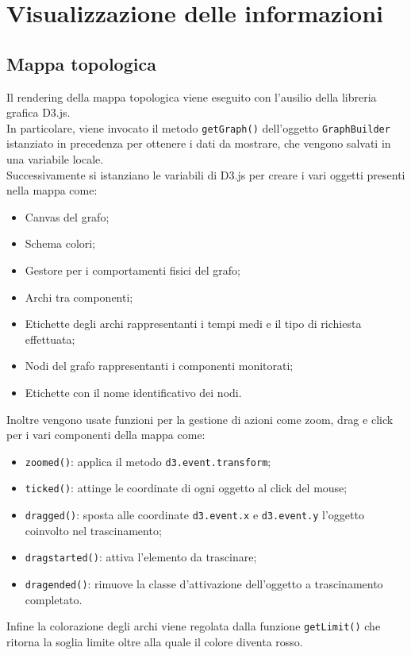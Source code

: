\section{Visualizzazione delle informazioni}

\subsection{Mappa topologica}
Il rendering della mappa topologica viene eseguito con l'ausilio della libreria grafica D3.js. \\
In particolare, viene invocato il metodo \texttt{getGraph()} dell'oggetto \texttt{GraphBuilder} istanziato in precedenza per ottenere i dati da mostrare, che vengono salvati in una variabile locale. \\
Successivamente si istanziano le variabili di D3.js per creare i vari oggetti presenti nella mappa come:
\begin{itemize}
	\item Canvas del grafo;
	\item Schema colori;
	\item Gestore per i comportamenti fisici del grafo;
	\item Archi tra componenti;
	\item Etichette degli archi rappresentanti i tempi medi e il tipo di richiesta effettuata;
	\item Nodi del grafo rappresentanti i componenti monitorati;
	\item Etichette con il nome identificativo dei nodi.
\end{itemize}
Inoltre vengono usate funzioni per la gestione di azioni come zoom, drag e click per i vari componenti della mappa come:
\begin{itemize}
	\item \texttt{zoomed()}: applica il metodo \texttt{d3.event.transform};
	\item \texttt{ticked()}: attinge le coordinate di ogni oggetto al click del mouse;
	\item \texttt{dragged()}: sposta alle coordinate \texttt{d3.event.x} e \texttt{d3.event.y} l'oggetto coinvolto nel trascinamento;
	\item \texttt{dragstarted()}: attiva l'elemento da trascinare;
	\item \texttt{dragended()}: rimuove la classe d'attivazione dell'oggetto a trascinamento completato.
\end{itemize}
Infine la colorazione degli archi viene regolata dalla funzione \texttt{getLimit()} che ritorna la soglia limite oltre alla quale il colore diventa rosso.
